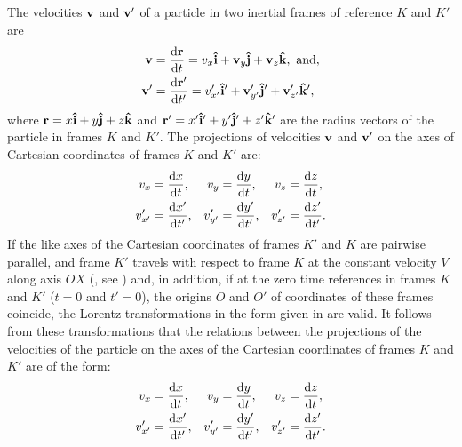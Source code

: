\subsection{}\label{5.5.1} The velocities $\vb{v}$ and $\vb{v}'$ of a particle in two inertial frames of reference $K$ and $K'$ are
\begin{align*}%
\vb{v} & = \dv{\vb{r}}{t} = v_{x}\vu{i}+ \vb{v}_{y}\vu{j}+ \vb{v}_{z}\vu{k}, \,\, \textrm{and},\\
\vb{v}'& =  \dv{\vb{r}'}{t'} = v_{x'}'\vu{i}'+ \vb{v}_{y'}'\vu{j}'+ \vb{v}_{z'}'\vu{k}',
\end{align*}
where $\vb{r} = x\vu{i}+ y\vu{j}+ z\vu{k}$ and $\vb{r}'= x'\vu{i}'+ y'\vu{j}'+ z'\vu{k}'$ are the radius vectors of the particle in frames $K$ and $K'$. The projections of velocities $\vb{v}$ and $\vb{v}'$ on the axes of Cartesian coordinates of frames $K$ and $K'$ are:
\begin{align*}%
v_{x} & = \dv{x}{t},& v_{y} &= \dv{y}{t},& v_{z} & = \dv{z}{t}, \\
v_{x'}' & = \dv{x'}{t'}, & v_{y'}' &= \dv{y'}{t'},& v_{z'}' &= \dv{z'}{t'}.
\end{align*}
If the like axes of the Cartesian coordinates of frames $K'$ and $K$ are pairwise parallel, and frame $K'$ travels with respect to frame $K$ at the constant velocity $V$ along axis $OX$ (, see ) and, in addition, if at the zero time references in frames $K$ and $K'$ ($t = 0$ and $t' =0$), the origins $O$ and $O'$ of coordinates of these frames coincide, the Lorentz transforma­tions in the form given in  are valid. It follows from these transformations that the relations between the projections of the velocities of the particle on the axes of the Cartesian coordi­nates of frames $K$ and $K'$ are of the form:
\begin{align*}%
v_{x} & = \dv{x}{t},& v_{y} &= \dv{y}{t},& v_{z} & = \dv{z}{t}, \\
v_{x'}' & = \dv{x'}{t'}, & v_{y'}' &= \dv{y'}{t'},& v_{z'}' &= \dv{z'}{t'}.
\end{align*}
